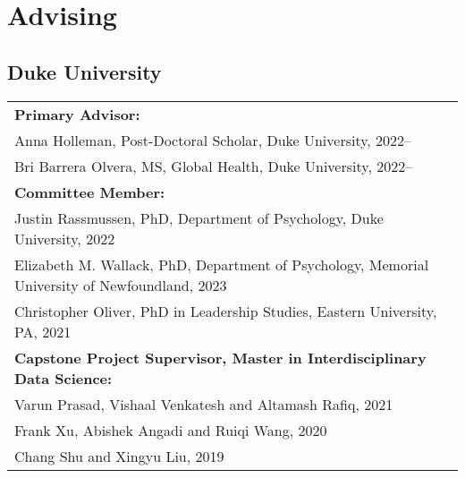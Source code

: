 \section*{Advising}
\subsection*{Duke University}
\begin{tabular}{p{}}
\textbf{Primary Advisor:}\\
Anna Holleman, Post-Doctoral Scholar, Duke University, 2022--\\
Bri Barrera Olvera, MS, Global Health, Duke University, 2022--\\
\textbf{Committee Member:}\\
Justin Rassmussen, PhD, Department of Psychology, Duke University, 2022\\
Elizabeth M. Wallack, PhD, Department of Psychology, Memorial University of Newfoundland, 2023\\
Christopher Oliver, PhD in Leadership Studies, Eastern University, PA, 2021\\
\textbf{Capstone Project Supervisor, Master in Interdisciplinary Data Science:}\\
Varun Prasad, Vishaal Venkatesh and Altamash Rafiq, 2021\\
Frank Xu, Abishek Angadi and Ruiqi Wang, 2020\\
Chang Shu and Xingyu Liu, 2019\\
\end{tabular}